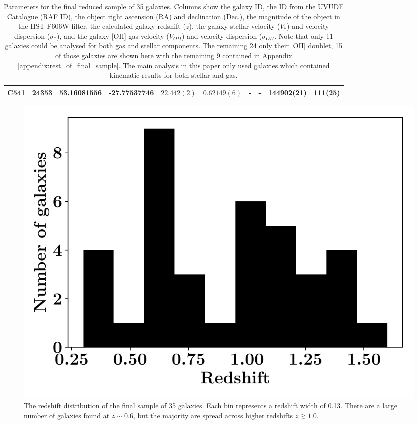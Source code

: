 \documentclass[12pt, twocolumn, nofootinbib]{revtex4-1}    %
\begin{document}
\begin{table}
\begin{tabular}{c@{\hskip 10pt}c@{\hskip 10pt}c@{\hskip 10pt}c@{\hskip 10pt}c@{\hskip 10pt}c@{\hskip 10pt}c@{\hskip 10pt}c@{\hskip 10pt}c@{\hskip 10pt}c}
C541 & 24353 & 53.16081556 & -27.77537746 & $22.442(2)$ & $0.62149(6)$ & - & - & 144902(21) & 111(25) \\ 
 \hline
\end{tabular}
\caption{Parameters for the final reduced sample of 35 galaxies. Columns show the galaxy ID, the ID from the UVUDF Catalogue \citep{2015AJ....150...31R} (RAF ID), the object right ascension (RA) and declination (Dec.), the magnitude of the object in the HST F606W filter, the calculated galaxy redshift ($z$), the galaxy stellar velocity ($V_*$) and velocity dispersion ($\sigma_*$), and the galaxy [OII] gas velocity ($V_{OII}$) and velocity dispersion ($\sigma_{OII}$. Note that only 11 galaxies could be analysed for both gas and stellar components. The remaining 24 only their [OII] doublet, 15 of those galaxies are shown here with the remaining 9 contained in Appendix \ref{appendix:rest_of_final_sample}. The main analysis in this paper only used galaxies which contained kinematic results for both stellar and gas.}
\label{table:final_sample}
\end{table}

\begin{figure}
\includegraphics[width=\linewidth]{data/redshift_distribution_oii_emitters.pdf}
\caption{The redshift distribution of the final sample of 35 galaxies. Each bin represents a redshift width of 0.13. There are a large number of galaxies found at $z\sim0.6$, but the majority are spread across higher redshifts $z\gtrsim1.0$.}
\label{fig:redshift_dist}
\end{figure}
\end{document}
